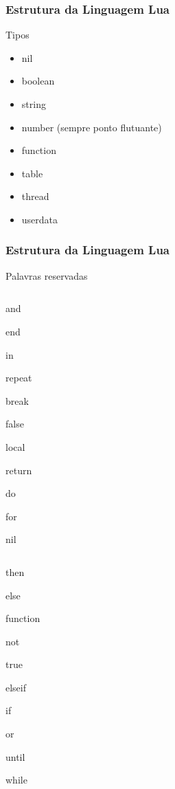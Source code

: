 \documentclass{beamer}
\begin{document}
\begin{frame}
    \frametitle{Estrutura da Linguagem Lua}
        Tipos 
            \begin{itemize}
                \item nil
                \item boolean
                \item string
                \item number (sempre ponto flutuante)
                \item function
                \item table
                \item thread
                \item userdata
            \end{itemize} 
\end{frame}


\begin{frame}
    \frametitle{Estrutura da Linguagem Lua}
     \begin{itemize}
        Palavras reservadas 
        \begin{columns}
            \begin{itemize}
            \begin{column}{5cm}
                \item and
                \item end
                \item in
                \item repeat
                \item break
                \item false
                \item local
                \item return
                \item do
                \item for
                \item nil
            \end{column}
            \begin{column}{5cm}
                \item then
                \item else
                \item function
                \item not
                \item true
                \item elseif
                \item if
                \item or
                \item until
                \item while
            \end{column}
            \end{itemize} 
        \end{columns}
    \end{itemize}
\end{frame}
\end{document}
